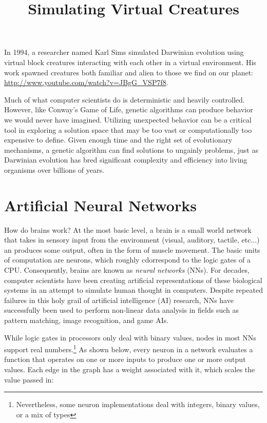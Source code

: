 \documentclass[12pt]{article}
\title{Simulating Virtual Creatures}
\date{}
\begin{document}
  \maketitle 
\newcommand{\TODO}{\hl{\emph{TODO:}}\hl}

In 1994, a researcher named Karl Sims simulated Darwinian evolution using virtual block creatures interacting with each other in a virtual environment.  His work spawned creatures both familiar and alien to those we find on our planet: \url{http://www.youtube.com/watch?v=JBgG_VSP7f8}. 

Much of what computer scientists do is deterministic and heavily controlled. However, like Conway’s Game of Life, genetic algorithms can produce behavior we would never have imagined. Utilizing unexpected behavior can be a critical tool in exploring a solution space that may be too vast or computationally too expensive to define. Given enough time and the right set of evolutionary mechanisms, a genetic algorithm can find solutions to ungainly problems, just as Darwinian evolution has bred significant complexity and efficiency into living organisms over billions of years.


\section{Artificial Neural Networks}

How do brains work? At the most basic level, a brain is a small world network that takes in sensory input from the environment (visual, auditory, tactile, etc...) an produces some output, often in the form of muscle movement. The basic units of computation are neurons, which roughly cdorrespond to the logic gates of a CPU. Consequently, brains are known as \emph{neural networks} (NNs). For decades, computer scientists have been creating artificial representations of these biological systems in an attempt to simulate human thought in computers. Despite repeated failures in this holy grail of artificial intelligence (AI) research, NNs have successfully been used to perform non-linear data analysis in fields such as pattern matching, image recognition, and game AIs.

While logic gates in processors only deal with binary values, nodes in most NNs support real numbers.\footnote{Nevertheless, some neuron implementations deal with integers, binary values, or a mix of types} As shown below, every neuron in a network evaluates a function that operates on one or more inputs to produce one or more output values. Each edge in the graph has a weight associated with it, which scales the value passed in:
\end{document}
